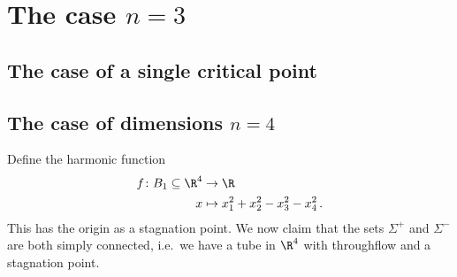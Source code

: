 \section*{The case $n=3$}

\subsection*{The case of a single critical point}

\newpage

\subsection*{The case of dimensions $n=4$}
Define the harmonic function 
\begin{align*}
  f\colon B_1\subseteq\R^4&\to \R \\
  x &\mapsto x_1^2+x_2^2-x_3^2-x_4^2\,.
\end{align*}
This has the origin as a stagnation point. We now claim that the sets $\Sigma^+$ and $\Sigma^-$ are both simply connected, i.e.\
we have a tube in $\R^4$ with throughflow and a stagnation point.

